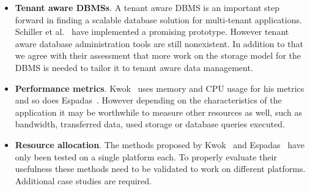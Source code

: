 \begin{itemize}
	\item \textbf{Tenant aware \acp{DBMS}}.
		A tenant aware \ac{DBMS} is an important step forward in finding a scalable database solution for multi-tenant applications.
		Schiller et al.~\cite{schiller2011native} have implemented a promising prototype. However tenant aware database administration tools are still nonexistent.
		In addition to that we agree with their assessment that more work on the storage model for the \ac{DBMS} is needed to tailor it to tenant aware data management.
	\item \textbf{Performance metrics}.
		Kwok~\cite{kwok2008resource} uses memory and CPU usage for his metrics and so does Espadas~\cite{espadas2013tenant}. 
		However depending on the characteristics of the application it may be worthwhile to measure other resources as well, such as bandwidth, transferred data, used storage or database queries executed. 
	\item \textbf{Resource allocation}.
		The methods proposed by Kwok~\cite{kwok2008resource} and Espadas~\cite{espadas2013tenant} have only been tested on a single platform each.
		To properly evaluate their usefulness these methods need to be validated to work on different platforms. Additional case studies are required.
\end{itemize}
